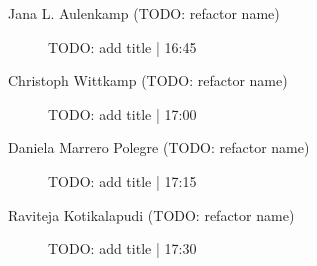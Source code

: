 \begin{symposium}
\begin{description}
                \item [Jana L. Aulenkamp (TODO: refactor name)] TODO: add title \textcolor{mygray}{ | 16:45}    
                
                \item [Christoph Wittkamp (TODO: refactor name)] TODO: add title \textcolor{mygray}{ | 17:00}    
                
                \item [Daniela Marrero Polegre (TODO: refactor name)] TODO: add title \textcolor{mygray}{ | 17:15}    
                
                \item [Raviteja Kotikalapudi (TODO: refactor name)] TODO: add title \textcolor{mygray}{ | 17:30}    
                
            \end{description} 
            \end{symposium}
            